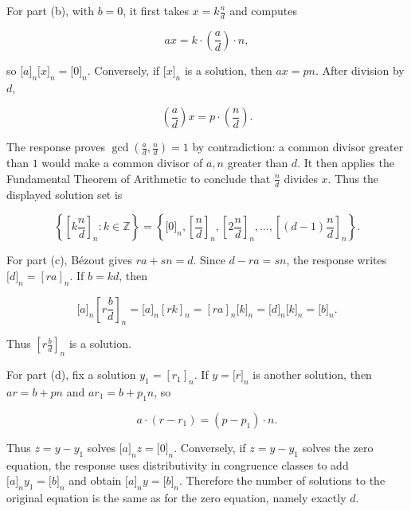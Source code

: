 For part (b), with \(b = 0\), it first takes \(x = k\frac{n}{d}\) and computes

\[ax = k \cdot \left( \frac{a}{d} \right) \cdot n,\]

so \(\lbrack a\rbrack_{n}\lbrack x\rbrack_{n} = \lbrack 0\rbrack_{n}\). Conversely, if \(\lbrack x\rbrack_{n}\) is a solution, then \(ax = pn\). After division by \(d\),

\[\left( \frac{a}{d} \right)x = p \cdot \left( \frac{n}{d} \right).\]

The response proves \(\gcd\left( {\frac{a}{d},\frac{n}{d}} \right) = 1\) by contradiction: a common divisor greater than \(1\) would make a common divisor of \(a,n\) greater than \(d\). It then applies the Fundamental Theorem of Arithmetic to conclude that \(\frac{n}{d}\) divides \(x\). Thus the displayed solution set is

\[\left\{ {\left\lbrack {k\frac{n}{d}} \right\rbrack_{n}:k \in \mathbb{Z}} \right\} = \left\{ {\lbrack 0\rbrack_{n},\left\lbrack \frac{n}{d} \right\rbrack_{n},\left\lbrack {2\frac{n}{d}} \right\rbrack_{n},\ldots,\left\lbrack {\left( {d - 1} \right)\frac{n}{d}} \right\rbrack_{n}} \right\}.\]

For part (c), Bézout gives \(ra + sn = d\). Since \(d - ra = sn\), the response writes \(\lbrack d\rbrack_{n} = \left\lbrack {ra} \right\rbrack_{n}\). If \(b = kd\), then

\[\lbrack a\rbrack_{n}\left\lbrack {r\frac{b}{d}} \right\rbrack_{n} = \lbrack a\rbrack_{n}\left\lbrack {rk} \right\rbrack_{n} = \left\lbrack {ra} \right\rbrack_{n}\lbrack k\rbrack_{n} = \lbrack d\rbrack_{n}\lbrack k\rbrack_{n} = \lbrack b\rbrack_{n}.\]

Thus \(\left\lbrack {r\frac{b}{d}} \right\rbrack_{n}\) is a solution.

For part (d), fix a solution \(y_{1} = \left\lbrack r_{1} \right\rbrack_{n}\). If \(y = \lbrack r\rbrack_{n}\) is another solution, then \(ar = b + pn\) and \(ar_{1} = b + p_{1}n\), so

\[a \cdot \left( {r - r_{1}} \right) = \left( {p - p_{1}} \right) \cdot n.\]

Thus \(z = y - y_{1}\) solves \(\lbrack a\rbrack_{n}z = \lbrack 0\rbrack_{n}\). Conversely, if \(z = y - y_{1}\) solves the zero equation, the response uses distributivity in congruence classes to add \(\lbrack a\rbrack_{n}y_{1} = \lbrack b\rbrack_{n}\) and obtain \(\lbrack a\rbrack_{n}y = \lbrack b\rbrack_{n}\). Therefore the number of solutions to the original equation is the same as for the zero equation, namely exactly \(d\).

